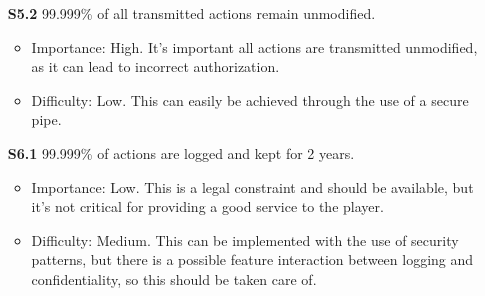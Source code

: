 \documentclass[a4paper,11pt]{report}
\begin{document}
\begin{itemize}
\begin{itemize}
\end{itemize}
\item[\textbf{S5.2}] 99.999\% of all transmitted actions remain unmodified.
\begin{itemize}
\item Importance: High. It's important all actions are transmitted unmodified, as it can lead to incorrect authorization.
\item Difficulty: Low. This can easily be achieved through the use of a secure pipe.
\end{itemize}
\item[\textbf{S6.1}] 99.999\% of actions are logged and kept for 2 years.
\begin{itemize}
\item Importance: Low. This is a legal constraint and should be available, but it's not critical for providing a good service to the player. 
\item Difficulty: Medium. This can be implemented with the use of security patterns, but there is a possible feature interaction between logging and confidentiality, so this should be taken care of.
\end{itemize}
\end{itemize}
\end{document}
